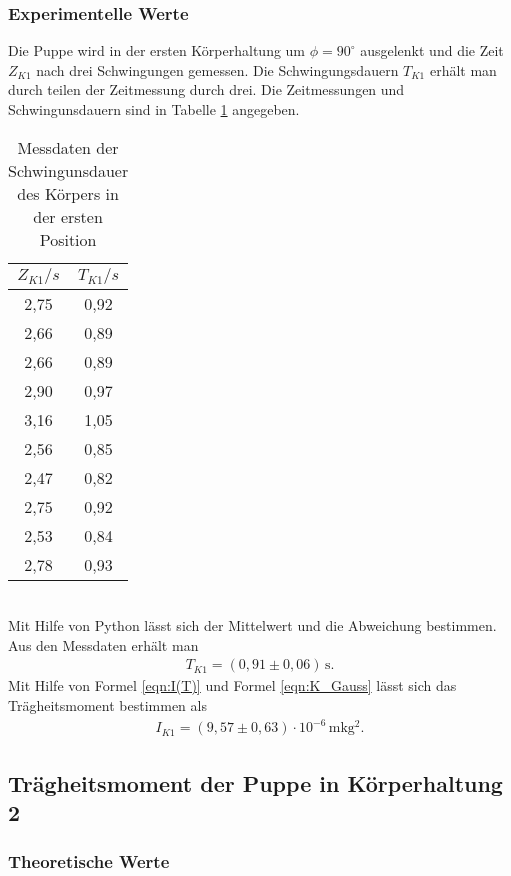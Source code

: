 \subsubsection{Experimentelle Werte}
Die Puppe wird in der ersten Körperhaltung um $\phi = 90^{\circ}$ ausgelenkt und die Zeit $Z_{K1}$ nach drei
Schwingungen gemessen. Die Schwingungsdauern $T_{K1}$ erhält man durch teilen der Zeitmessung durch drei. Die Zeitmessungen und
Schwingunsdauern sind in Tabelle \ref{tab:Koerper1} angegeben.
\begin{table}
  \centering
  \caption{Messdaten der Schwingunsdauer des Körpers in der ersten Position}
  \label{tab:Koerper1}
  \begin{tabular}{c c}
    \toprule
    $Z_{K1}/s$ & $T_{K1}/s$ \\
    \midrule
    2,75 & 0,92 \\
    2,66 & 0,89 \\
    2,66 & 0,89 \\
    2,90 & 0,97 \\
    3,16 & 1,05 \\
    2,56 & 0,85 \\
    2,47 & 0,82 \\
    2,75 & 0,92 \\
    2,53 & 0,84 \\
    2,78 & 0,93 \\
    \bottomrule
  \end{tabular}
\end{table}
\\
Mit Hilfe von Python lässt sich der Mittelwert und die Abweichung bestimmen. Aus den Messdaten
erhält man
\begin{align*}
  T_{K1} = (0{,}91 \pm 0{,}06)\, \mathrm{s} .
\end{align*}
Mit Hilfe von Formel \ref{eqn:I(T)} und Formel \ref{eqn:K_Gauss} lässt sich das Trägheitsmoment bestimmen als
\begin{align*}
  I_{K1} = (9{,}57 \pm 0{,}63) \cdot 10^{-6}\, \mathrm{mkg^2}.
\end{align*}

\subsection{Trägheitsmoment der Puppe in Körperhaltung 2}
\label{TraegheitsmomentderPuppeinKoerperhaltung2}
\subsubsection{Theoretische Werte}

